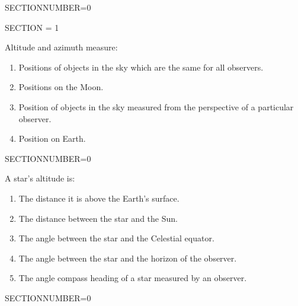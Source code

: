 \documentclass[11pt]{article}
\begin{document}
\begin{enumerate}
\begin{minipage}{\textwidth}
\begin{minipage}{\textwidth}
\end{minipage}
SECTIONNUMBER=0
\end{minipage}
\vskip 0.20in

\pagebreak 
\begin{minipage}{\textwidth} 
\begin{minipage}{\textwidth} 
\bigskip SECTION = 1
\end{minipage}
\end{minipage}
\begin{minipage}{\textwidth}
\begin{minipage}{\textwidth}
\item Altitude and azimuth measure:
\begin{enumerate} 
\setlength{\itemsep}{1pt} 
\setlength{\parskip}{0pt} 
\setlength{\parsep}{0pt}
\setlength{\multicolsep}{1pt} 
\item Positions of objects in the sky which are the same for all observers.
\item Positions on the Moon.
\item Position of objects in the sky measured from the perspective of a particular observer.
\item Position on Earth.
\end{enumerate} 
\end{minipage}
SECTIONNUMBER=0
\end{minipage}
\vskip 0.20in

\begin{minipage}{\textwidth}
\begin{minipage}{\textwidth}
\item A star's altitude is:
\begin{enumerate} 
\setlength{\itemsep}{1pt} 
\setlength{\parskip}{0pt} 
\setlength{\parsep}{0pt}
\setlength{\multicolsep}{1pt} 
\item The distance it is above the Earth's surface.
\item The distance between the star and the Sun.
\item The angle between the star and the Celestial equator.
\item The angle between the star and the horizon of the observer.
\item The angle compass heading of a star measured by an observer.
\end{enumerate} 
\end{minipage}
SECTIONNUMBER=0
\end{minipage}
\vskip 0.20in


\end{enumerate}
\end{document}
